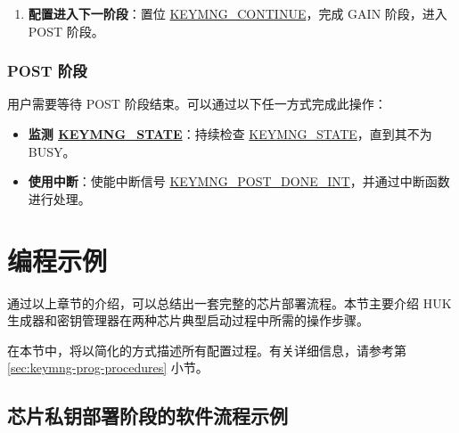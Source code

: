 \documentclass[main\_\_CN.tex]{subfiles}
\begin{document}
\begin{enumerate}
\begin{itemize}
        \item \textbf{\hyperref[para:keyinfo]{\begin{math}key\_info\end{math}} 导出模式：}
        \begin{enumerate}
            \item 从 \hyperref[mem:keymng-public-info]{KEYMNG\_PUBLIC\_INFO\_MEM} 中读取 \hyperref[para:keyinfo]{\begin{math}key\_info\end{math}}（512 位）。
        \end{enumerate}
    \end{itemize}
    \item \textbf{配置进入下一阶段}：置位 \hyperref[fielddesc:KEYMNGCONTINUE]{KEYMNG\_CONTINUE}，完成 GAIN 阶段，进入 POST 阶段。
\end{enumerate}

\subsubsection{POST 阶段}

用户需要等待 POST 阶段结束。可以通过以下任一方式完成此操作：
\begin{itemize}
    \item \textbf{监测 \hyperref[fielddesc:KEYMNGSTATE]{KEYMNG\_STATE}}：持续检查 \hyperref[fielddesc:KEYMNGSTATE]{KEYMNG\_STATE}，直到其不为 BUSY。
    \item \textbf{使用中断}：使能中断信号 \hyperref[int:KEYMNGPOSTDONEINT]{KEYMNG\_POST\_DONE\_INT}，并通过中断函数进行处理。
\end{itemize}



\section{编程示例}
通过以上章节的介绍，可以总结出一套完整的芯片部署流程。本节主要介绍 HUK 生成器和密钥管理器在两种芯片典型启动过程中所需的操作步骤。

\vspace{-0.5em}
\begin{tiplisting}
在本节中，将以简化的方式描述所有配置过程。有关详细信息，请参考第 \ref{sec:keymng-prog-procedures} 小节。
\end{tiplisting}

\subsection{芯片私钥部署阶段的软件流程示例}
\end{document}
